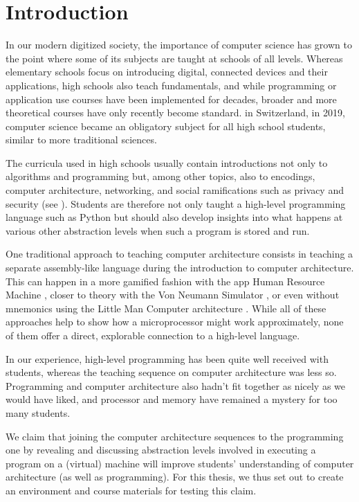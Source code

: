 
\chapter{Introduction}

In our modern digitized society, the importance of computer science has grown to the point where some of its subjects are taught at schools of all levels. Whereas elementary schools focus on introducing digital, connected devices and their applications, high schools also teach fundamentals, and while programming or application use courses have been implemented for decades, broader and more theoretical courses have only recently become standard. \eg in Switzerland, in 2019, computer science became an obligatory subject for all high school students, similar to more traditional sciences.

The curricula used in high schools usually contain introductions not only to algorithms and programming but, among other topics, also to encodings, computer architecture, networking, and social ramifications such as privacy and security (see \eg \cite{Erz16}). Students are therefore not only taught a high-level programming language such as Python but should also develop insights into what happens at various other abstraction levels when such a program is stored and run.

One traditional approach to teaching computer architecture consists in teaching a separate assembly-like language during the introduction to computer architecture. This can happen in a more gamified fashion \eg with the app Human Resource Machine \cite{Tom15}, closer to theory with the Von Neumann Simulator \cite{Gan23}, or even without mnemonics using the Little Man Computer architecture \cite{Oin25}. While all of these approaches help to show how a microprocessor might work approximately, none of them offer a direct, explorable connection to a high-level language.

In our experience, high-level programming has been quite well received with students, whereas the teaching sequence on computer architecture was less so. Programming and computer architecture also hadn't fit together as nicely as we would have liked, and processor and memory have remained a mystery for too many students.

We claim that joining the computer architecture sequences to the programming one by revealing and discussing abstraction levels involved in executing a program on a (virtual) machine will improve students' understanding of computer architecture (as well as programming). For this thesis, we thus set out to create an environment and course materials for testing this claim.

